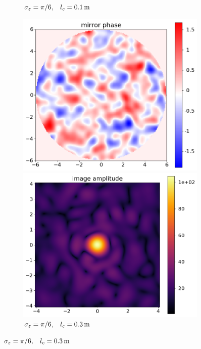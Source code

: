 \documentclass{article}
\newcommand{\eps}{\varepsilon}
\begin{document}
\begin{figure}
\begin{subfigure}{0.5\textwidth}
\begin{minipage}{0.5\textwidth}
        \end{minipage}
        \caption{$\sigma_{\eps} = \pi/6 \qq*{,} l_c = \SI{0.1}{m}$}\label{fig:corrpic:1}
    \end{subfigure}%
    \hfill
    \begin{subfigure}{0.5\textwidth}
        \begin{minipage}{0.5\textwidth}
            \centering
            \includegraphics[width=\textwidth]{pictures/error_pics/errors3in_phase.png}
        \end{minipage}%
        \begin{minipage}{0.5\textwidth}
            \centering
            \includegraphics[width=\textwidth]{pictures/error_pics/errors3out_abs.png}
        \end{minipage}
        \caption{$\sigma_{\eps} = \pi/6 \qq*{,} l_c = \SI{0.3}{m}$}\label{fig:corrpic:2}
    \end{subfigure}


\end{figure}
\end{document}
